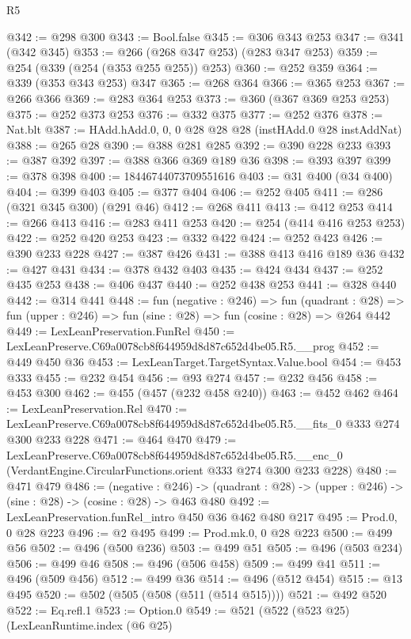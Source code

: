 \begin{lexlean}{R5}
\begin{coremodule}
@342 := @298 @300
@343 := Bool.false
@345 := @306 @343 @253
@347 := @341 (@342 @345)
@353 := @266 (@268 @347 @253) (@283 @347 @253)
@359 := @254 (@339 (@254 (@353 @255 @255)) @253)
@360 := @252 @359
@364 := @339 (@353 @343 @253) @347
@365 := @268 @364
@366 := @365 @253
@367 := @266 @366
@369 := @283 @364 @253
@373 := @360 (@367 @369 @253 @253)
@375 := @252 @373 @253
@376 := @332 @375
@377 := @252 @376
@378 := Nat.blt
@387 := HAdd.hAdd.{0, 0, 0} @28 @28 @28 (instHAdd.{0} @28 instAddNat)
@388 := @265 @28
@390 := @388 @281 @285
@392 := @390 @228 @233
@393 := @387 @392
@397 := @388 @366 @369 @189 @36
@398 := @393 @397
@399 := @378 @398
@400 := 18446744073709551616
@403 := @31 @400 (@34 @400)
@404 := @399 @403
@405 := @377 @404
@406 := @252 @405
@411 := @286 (@321 @345 @300) (@291 @46)
@412 := @268 @411
@413 := @412 @253
@414 := @266 @413
@416 := @283 @411 @253
@420 := @254 (@414 @416 @253 @253)
@422 := @252 @420 @253
@423 := @332 @422
@424 := @252 @423
@426 := @390 @233 @228
@427 := @387 @426
@431 := @388 @413 @416 @189 @36
@432 := @427 @431
@434 := @378 @432 @403
@435 := @424 @434
@437 := @252 @435 @253
@438 := @406 @437
@440 := @252 @438 @253
@441 := @328 @440
@442 := @314 @441
@448 := fun (negative : @246) =>
  fun (quadrant : @28) => fun (upper : @246) => fun (sine : @28) => fun (cosine : @28) => @264 @442
@449 := LexLeanPreservation.FunRel
@450 := LexLeanPreserve.C69a0078cb8f644959d8d87c652d4be05.R5.__prog
@452 := @449 @450 @36
@453 := LexLeanTarget.TargetSyntax.Value.bool
@454 := @453 @333
@455 := @232 @454
@456 := @93 @274
@457 := @232 @456
@458 := @453 @300
@462 := @455 (@457 (@232 @458 @240))
@463 := @452 @462
@464 := LexLeanPreservation.Rel
@470 := LexLeanPreserve.C69a0078cb8f644959d8d87c652d4be05.R5.__fits_0 @333 @274 @300 @233 @228
@471 := @464 @470
@479 := LexLeanPreserve.C69a0078cb8f644959d8d87c652d4be05.R5.__enc_0
    (VerdantEngine.CircularFunctions.orient @333 @274 @300 @233 @228)
@480 := @471 @479
@486 := (negative : @246) ->
  (quadrant : @28) -> (upper : @246) -> (sine : @28) -> (cosine : @28) -> @463 @480
@492 := LexLeanPreservation.funRel_intro @450 @36 @462 @480 @217
@495 := Prod.{0, 0} @28 @223
@496 := @2 @495
@499 := Prod.mk.{0, 0} @28 @223
@500 := @499 @56
@502 := @496 (@500 @236)
@503 := @499 @51
@505 := @496 (@503 @234)
@506 := @499 @46
@508 := @496 (@506 @458)
@509 := @499 @41
@511 := @496 (@509 @456)
@512 := @499 @36
@514 := @496 (@512 @454)
@515 := @13 @495
@520 := @502 (@505 (@508 (@511 (@514 @515))))
@521 := @492 @520
@522 := Eq.refl.{1}
@523 := Option.{0}
@549 := @521
    (@522
      (@523 @25)
      (LexLeanRuntime.index
        (@6 @25)

\end{coremodule}
\end{lexlean}
